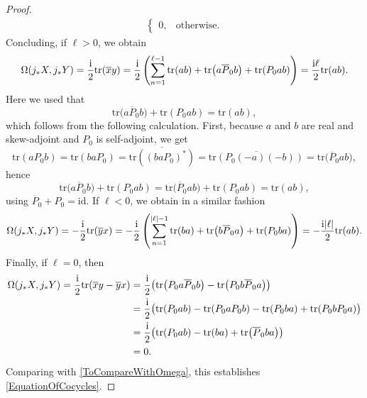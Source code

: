 \documentclass[11pt]{article}
\numberwithin{equation}{section}
\numberwithin{equation}{section}
\newcommand{\tr}{\mathrm{tr}}
\newcommand{\id}{\mathrm{id}}
\begin{document}
\begin{proof}
\begin{align*}
\begin{cases}
 0, & \text{otherwise}.
 \end{cases}	
\end{align*}
Concluding, if $\ell >0$, we obtain
\begin{equation*}
 \Omega(j_*X, j_*Y) = \frac{{\rm i}}{2} \tr(\overline{x}y) = \frac{{\rm i}}{2} \left(\sum_{n=1}^{\ell-1}\tr(ab) + \tr\big(a\overline{P}_0 b\big) + \tr(P_0ab) \right) = \frac{{\rm i}\ell}{2}\tr(ab).
\end{equation*}
Here we used that
\[\tr\big(a\overline{P}_0 b\big) + \tr(P_0ab) = \tr(ab),\] which follows from the following calculation.
First, because $a$ and $b$ are real and skew-adjoint and $P_0$ is self-adjoint, we get
\begin{equation*}
 	\tr(aP_0b) = \tr(baP_0) = \overline{\tr((baP_0)^*)} = \overline{\tr(P_0 (-a)(-b))} = \tr\big(\overline{P}_0ab\big),
\end{equation*}
hence
\begin{equation*}
	\tr\big(a\overline{P}_0 b\big) + \tr(P_0ab) = \tr\big(\overline{P}_0 ab\big) + \tr(P_0ab) = \tr(ab),
\end{equation*}
using $\overline{P}_0 + P_0 = \id$.
If $\ell < 0$, we obtain in a similar fashion
\begin{equation*}
 \Omega(j_*X, j_*Y) = -\frac{{\rm i}}{2} \tr(\overline{y}x) = -\frac{{\rm i}}{2} \left(\sum_{n=1}^{|\ell|-1}\tr(ba) + \tr\big(b\overline{P}_0 a\big) + \tr(P_0ba) \right) = -\frac{{\rm i}|\ell|}{2}\tr(ab).
\end{equation*}
Finally, if $\ell=0$, then
\begin{equation*}
\begin{aligned}
 	\Omega(j_*X, j_*Y) = \frac{{\rm i}}{2} \tr(\overline{x}y - \overline{y}x)
 	&= \frac{{\rm i}}{2} \big(\tr\big(P_0 a\overline{P}_0b\big) - \tr\big(P_0 b\overline{P}_0a\big)\big)\\
 	&= \frac{{\rm i}}{2} \big(\tr(P_0 ab) - \tr(P_0 a{P}_0b) - \tr(P_0 ba) + \tr(P_0 bP_0a)\big) \\
 	&=\frac{{\rm i}}{2} \big(\tr(P_0 ab) - \tr(ba) + \tr\big(\overline{P}_0 ba\big) \big) \\
 	& = 0.
\end{aligned}
\end{equation*}
Comparing with \eqref{ToCompareWithOmega}, this establishes \eqref{EquationOfCocycles}.
\end{proof}
\end{document}
